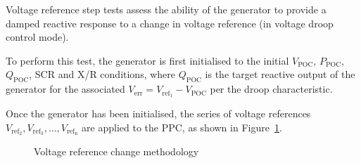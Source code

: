 Voltage reference step tests assess the ability of the generator to provide a damped reactive response to a change in voltage reference (in voltage droop control mode).

To perform this test, the generator is first initialised to the initial $V_{\mathrm{POC}}$, $P_{\mathrm{POC}}$, $Q_{\mathrm{POC}}$, SCR and X/R conditions, where $Q_{\mathrm{POC}}$ is the target reactive output of the generator for the associated $V_{\mathrm{err}} = V_{\mathrm{ref}_{\mathrm{1}}} - V_{\mathrm{POC}}$ per the droop characteristic.

Once the generator has been initialised, the series of voltage references $V_{\mathrm{ref}_{\mathrm{2}}}, V_{\mathrm{ref}_{\mathrm{3}}}, \dots, V_{\mathrm{ref}_{\mathrm{n}}}$ are applied to the PPC, as shown in Figure~\ref{fig:smib-vref-change-methodology}.

\begin{figure}[h]
	\centering
	
	\caption{Voltage reference change methodology}
	\label{fig:smib-vref-change-methodology}
\end{figure}